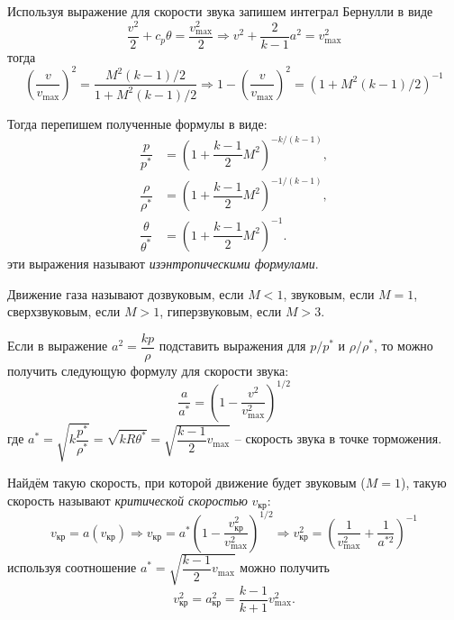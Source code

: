 Используя выражение для скорости звука запишем интеграл Бернулли в виде
\[
  \dfrac{v^2}{2} + c_p \theta = \dfrac{v_{\max}^2}{2} \Rightarrow
  v^2 + \dfrac{2}{k-1} a^2 = v_{\max}^2
\]
тогда
\[
  \left( \dfrac{v}{v_{\max}} \right)^2 = \dfrac{M^2 (k-1)/2}{1 + M^2 (k-1)/2}
  \Rightarrow
  1 - \left( \dfrac{v}{v_{\max}} \right)^2 = \left( 1 + M^2 (k-1)/2 \right)^{-1}
\]

Тогда перепишем полученные формулы в виде:
\begin{align*}
  \dfrac{p}{p^*} &= \left( 1 + \dfrac{k-1}{2} M^2 \right)^{- k / (k-1)}, \\
  \dfrac{\rho}{\rho^*} &= \left( 1 + \dfrac{k-1}{2} M^2 \right)^{-1 / (k-1)}, \\
  \dfrac{\theta}{\theta^*} &= \left( 1 + \dfrac{k-1}{2} M^2 \right)^{-1}.
\end{align*}
эти выражения называют \emph{изэнтропическими формулами}.

Движение газа называют дозвуковым, если $M < 1$, звуковым, если $M = 1$,
сверхзвуковым, если $M > 1$, гиперзвуковым, если $M > 3$.

Если в выражение $a^2 = \dfrac{kp}{\rho}$ подставить выражения для $p / p^*$ и $\rho / \rho^*$,
то можно получить следующую формулу для скорости звука:
\[
  \dfrac{a}{a^*} = \left( 1 - \dfrac{v^2}{v_{\max}^2} \right)^{1/2}
\]
где $a^* = \sqrt{ k\dfrac{p^*}{\rho^*} } = \sqrt{k R \theta^*} = \sqrt{ \dfrac{k-1}{2} v_{\max} }$
-- скорость звука в точке торможения.

Найдём такую скорость, при которой движение будет звуковым ($M = 1$), такую скорость называют 
\emph{критической скоростью} $v_\text{кр}$:
\[
  v_\text{кр} = a(v_\text{кр})
  \Rightarrow
  v_\text{кр} = a^* \left( 1 - \dfrac{v_\text{кр}^2}{v_{\max}^2} \right)^{1/2}
  \Rightarrow
  v_\text{кр}^2 = \left( \dfrac{1}{v_{\max}^2} + \dfrac{1}{a^{*2}} \right)^{-1}
\]
используя соотношение $a^* = \sqrt{ \dfrac{k-1}{2} v_{\max} }$ можно получить
\[
  v_\text{кр}^2 = a_\text{кр}^2 = \dfrac{k-1}{k+1} v_{\max}^2.
\]
